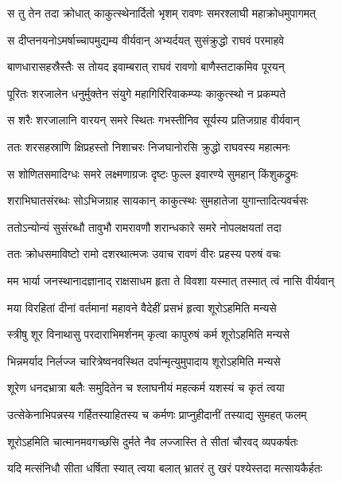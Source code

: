 
\twolineshloka
{स तु तेन तदा क्रोधात् काकुत्स्थेनार्दितो भृशम्}
{रावणः समरश्लाघी महाक्रोधमुपागमत्} %

\twolineshloka
{स दीप्तनयनोऽमर्षाच्चापमुद्यम्य वीर्यवान्}
{अभ्यर्दयत् सुसंक्रुद्धो राघवं परमाहवे} %

\twolineshloka
{बाणधारासहस्रैस्तैः स तोयद इवाम्बरात्}
{राघवं रावणो बाणैस्तटाकमिव पूरयन्} %

\twolineshloka
{पूरितः शरजालेन धनुर्मुक्तेन संयुगे}
{महागिरिरिवाकम्प्यः काकुत्स्थो न प्रकम्पते} %

\twolineshloka
{स शरैः शरजालानि वारयन् समरे स्थितः}
{गभस्तीनिव सूर्यस्य प्रतिजग्राह वीर्यवान्} %

\twolineshloka
{ततः शरसहस्राणि क्षिप्रहस्तो निशाचरः}
{निजघानोरसि क्रुद्धो राघवस्य महात्मनः} %

\twolineshloka
{स शोणितसमादिग्धः समरे लक्ष्मणाग्रजः}
{दृष्टः फुल्ल इवारण्ये सुमहान् किंशुकद्रुमः} %

\twolineshloka
{शराभिघातसंरब्धः सोऽभिजग्राह सायकान्}
{काकुत्स्थः सुमहातेजा युगान्तादित्यवर्चसः} %

\twolineshloka
{ततोऽन्योन्यं सुसंरब्धौ तावुभौ रामरावणौ}
{शरान्धकारे समरे नोपलक्षयतां तदा} %

\twolineshloka
{ततः क्रोधसमाविष्टो रामो दशरथात्मजः}
{उवाच रावणं वीरः प्रहस्य परुषं वचः} %

\twolineshloka
{मम भार्या जनस्थानादज्ञानाद् राक्षसाधम}
{हृता ते विवशा यस्मात् तस्मात् त्वं नासि वीर्यवान्} %

\twolineshloka
{मया विरहितां दीनां वर्तमानां महावने}
{वैदेहीं प्रसभं हृत्वा शूरोऽहमिति मन्यसे} %

\twolineshloka
{स्त्रीषु शूर विनाथासु परदाराभिमर्शनम्}
{कृत्वा कापुरुषं कर्म शूरोऽहमिति मन्यसे} %

\twolineshloka
{भिन्नमर्याद निर्लज्ज चारित्रेष्वनवस्थित}
{दर्पान्मृत्युमुपादाय शूरोऽहमिति मन्यसे} %

\twolineshloka
{शूरेण धनदभ्रात्रा बलैः समुदितेन च}
{श्लाघनीयं महत्कर्म यशस्यं च कृतं त्वया} %

\twolineshloka
{उत्सेकेनाभिपन्नस्य गर्हितस्याहितस्य च}
{कर्मणः प्राप्नुहीदानीं तस्याद्य सुमहत् फलम्} %

\twolineshloka
{शूरोऽहमिति चात्मानमवगच्छसि दुर्मते}
{नैव लज्जास्ति ते सीतां चौरवद् व्यपकर्षतः} %

\twolineshloka
{यदि मत्संनिधौ सीता धर्षिता स्यात् त्वया बलात्}
{भ्रातरं तु खरं पश्येस्तदा मत्सायकैर्हतः} %

